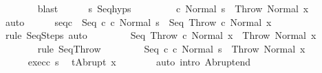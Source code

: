 \begin{isabellebody}
\ \ \ \ \ \ \isamarkupfalse%
\ blast\isanewline
\ \ \ \ \isamarkupfalse%
\ s{\isacharprime}\ Seq{\isachardot}hyps\ {\isacharparenleft}{}{\isacharparenright}\ \isanewline
\ \ \ \ \isamarkupfalse%
\ {\isachardoublequoteopen}{\isasymGamma}{\isasymturnstile}\ {\isacharparenleft}c\ Normal\ s{\isacharparenright}\ {\isasymrightarrow}\isactrlsup {\isacharasterisk}\ {\isacharparenleft}Throw{\isacharcomma}\ Normal\ x{\isacharparenright}{\isachardoublequoteclose}\isanewline
\ \ \ \ \ \ \isamarkupfalse%
\ auto\isanewline
\ \ \ \ \isamarkupfalse%
\ seq{\isacharunderscore}c\ {\isachardoublequoteopen}{\isasymGamma}{\isasymturnstile}\ {\isacharparenleft}Seq\ c\ c\ Normal\ s{\isacharparenright}\ {\isasymrightarrow}\isactrlsup {\isacharasterisk}\ {\isacharparenleft}Seq\ Throw\ c\ Normal\ x{\isacharparenright}{\isachardoublequoteclose}\isanewline
\ \ \ \ \ \ \isamarkupfalse%
\ {\isacharparenleft}rule\ SeqSteps{\isacharparenright}\ auto\isanewline
\ \ \ \ \isamarkupfalse%
\ \isamarkupfalse%
\ {\isachardoublequoteopen}{\isasymGamma}{\isasymturnstile}\ {\isacharparenleft}Seq\ Throw\ c\ Normal\ x{\isacharparenright}\ {\isasymrightarrow}\ {\isacharparenleft}Throw{\isacharcomma}\ Normal\ x{\isacharparenright}{\isachardoublequoteclose}\isanewline
\ \ \ \ \ \ \isamarkupfalse%
\ {\isacharparenleft}rule\ SeqThrow{\isacharparenright}\isanewline
\ \ \ \ \isamarkupfalse%
\ \isamarkupfalse%
\ {\isachardoublequoteopen}{\isasymGamma}{\isasymturnstile}\ {\isacharparenleft}Seq\ c\ c\ Normal\ s{\isacharparenright}\ {\isasymrightarrow}\isactrlsup {\isacharasterisk}\ {\isacharparenleft}Throw{\isacharcomma}\ Normal\ x{\isacharparenright}{\isachardoublequoteclose}\isacommand{{\isachardot}}\isamarkupfalse%
\isanewline
\ \ \ \ \isamarkupfalse%
\isanewline
\ \ \ \ \isamarkupfalse%
\ exec{\isacharunderscore}c\ s{\isacharprime}\ \isamarkupfalse%
\ {\isachardoublequoteopen}t{\isacharequal}Abrupt\ x{\isachardoublequoteclose}\isanewline
\ \ \ \ \ \ \isamarkupfalse%
\ {\isacharparenleft}auto\ intro{\isacharcolon}\ Abrupt{\isacharunderscore}end{\isacharparenright}\isanewline

\end{isabellebody}
